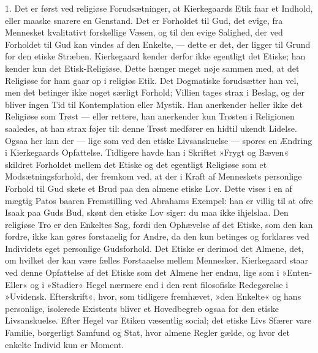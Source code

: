 \documentclass[12pt,a4paper,openany]{book}
\newcommand{\opage}[1]{\marginnote{\footnotesize\textit{[#1]}}}
\begin{document}
1. Det er først ved religiøse Forudsætninger, at
Kierkegaards Etik faar et Indhold, eller maaske snarere
en Genstand. Det er Forholdet til Gud, det evige, fra
Mennesket kvalitativt forskellige Væsen, og til den evige
Salighed, der ved Forholdet til Gud kan vindes af den
Enkelte, --- dette er det, der ligger til Grund for den
etiske Stræben. Kierkegaard kender derfor ikke egentligt
det Etiske; han kender kun det Etisk-Religiøse. Dette
hænger meget nøje sammen med, at det Religiøse for ham
gaar op i religiøs Etik. Det Dogmatiske forudsætter han
vel, men det betinger ikke noget særligt Forhold; Villien
tages strax i Beslag, og der bliver ingen Tid til Kontemplation
eller Mystik. Han anerkender heller ikke det
Religiøse som Trøst --- eller rettere, han anerkender kun
Trøsten i Religionen saaledes, at han strax føjer til:
denne Trøst medfører en hidtil ukendt Lidelse.
\opage{110}Ogsaa her kan der --- lige som ved den etiske Livsanskuelse
--- spores en Ændring i Kierkegaards Opfattelse.
Tidligere havde han i Skriftet »Frygt og Bæven«
skildret Forholdet mellem det Etiske og det egentligt
Religiøse som et Modsætningsforhold, der fremkom ved,
at der i Kraft af Menneskets personlige Forhold til Gud
skete et Brud paa den almene etiske Lov. Dette vises
i en af mægtig Patos baaren Fremstilling ved Abrahams
Exempel: han er villig til at ofre Isaak paa Guds Bud,
skønt den etiske Lov siger: du maa ikke ihjelslaa. Den
religiøse Tro er den Enkeltes Sag, fordi den Ophævelse
af det Etiske, som den kan fordre, ikke kan gøres forstaaelig
for Andre, da den kun betinges og forklares ved
Individets eget personlige Gudsforhold. Det Etiske er
derimod det Almene, det, om hvilket der kan være fælles
Forstaaelse mellem Mennesker. Kierkegaard staar ved
denne Opfattelse af det Etiske som det Almene her endnu,
lige som i »Enten-Eller« og i »Stadier« Hegel nærmere
end i den rent filosofiske Redegørelse i »Uvidensk. Efterskrift«,
hvor, som tidligere fremhævet, »den Enkelte« og
hans personlige, isolerede Existents bliver et Hovedbegreb
ogsaa for den etiske Livsanskuelse. Efter Hegel var
Etiken væsentlig social; det etiske Livs Sfærer vare
Familie, borgerligt Samfund og Stat, hvor almene Regler
gælde, og hvor det enkelte Individ kun er Moment.
\end{document}
